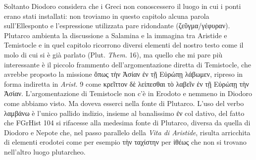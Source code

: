 {    Soltanto  Diodoro considera che i Greci non conoscessero il luogo in cui i ponti erano stati installati: non troviamo in questo capitolo alcuna parola sull'Ellesponto e l'espressione  utilizzata pare ridondante (\textgreek{ζεῦγμα/γέφυραν}). Plutarco ambienta la discussione a Salamina e la immagina tra Aristide e Temistocle e in quel capitolo ricorrono diversi elementi del nostro testo come il molo di cui si è già parlato (Plut. \emph{Them.}  16), ma quello che mi pare più interessante è il piccolo frammento dell'argomentazione diretta di Temistocle, che avrebbe proposto la missione \textgreek{ὅπως τὴν Ἀσίαν ἐν τῇ Εὐρώπῃ λάβωμεν}, ripreso in forma indiretta in \emph{Arist. }9 come \textgreek{κρεῖττον δὲ λείπεσθαι τὸ λαβεῖν ἐν τῇ Εὐρώπῃ τὴν Ἀσίαν}.  L'argomentazione di Temistocle non c'è in Erodoto e nemmeno in  Diodoro come abbiamo visto. Ma doveva esserci nella fonte di Plutarco. L'uso del verbo \textgreek{λαμβάνω} è l'unico pallido indizio, insieme al banalissimo \textgreek{ἐν} col dativo, del fatto che FGrHist 104 si rifacesse alla medesima fonte di Plutarco, diversa da quella di  Diodoro e  Nepote che, nel passo parallelo della \emph{Vita di Aristide}, risulta arricchita di elementi erodotei come per esempio \textgreek{τὴν  ταχίστην} per \textgreek{ἰθέως} che non si trovano nell'altro luogo plutarcheo. 
}
